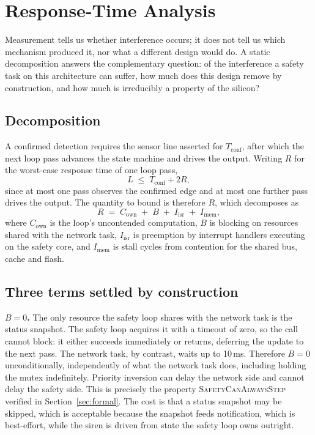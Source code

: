 \section{Response-Time Analysis}\label{sec:timing}

Measurement tells us whether interference occurs; it does not tell us which mechanism produced
it, nor what a different design would do. A static decomposition answers the complementary
question: of the interference a safety task on this architecture can suffer, how much does this
design remove by construction, and how much is irreducibly a property of the silicon?

\subsection{Decomposition}

A confirmed detection requires the sensor line asserted for $T_{\mathrm{conf}}$, after which the
next loop pass advances the state machine and drives the output. Writing $R$ for the worst-case
response time of one loop pass,
\begin{equation}
L \;\le\; T_{\mathrm{conf}} + 2R,
\label{eq:Lbound}
\end{equation}
since at most one pass observes the confirmed edge and at most one further pass drives the
output. The quantity to bound is therefore $R$, which decomposes as
\begin{equation}
R \;=\; C_{\mathrm{own}} \;+\; B \;+\; I_{\mathrm{isr}} \;+\; I_{\mathrm{mem}},
\label{eq:decomp}
\end{equation}
where $C_{\mathrm{own}}$ is the loop's uncontended computation, $B$ is blocking on resources
shared with the network task, $I_{\mathrm{isr}}$ is preemption by interrupt handlers executing on
the safety core, and $I_{\mathrm{mem}}$ is stall cycles from contention for the shared bus,
cache and flash.

\subsection{Three terms settled by construction}

\textbf{$B = 0$.} The only resource the safety loop shares with the network task is the status
snapshot. The safety loop acquires it with a timeout of zero, so the call cannot block: it either
succeeds immediately or returns, deferring the update to the next pass. The network task, by
contrast, waits up to 10\,ms. Therefore $B = 0$ unconditionally, independently of what the
network task does, including holding the mutex indefinitely. Priority inversion can delay the
network side and cannot delay the safety side. This is precisely the property
\textsc{SafetyCanAlwaysStep} verified in Section~\ref{sec:formal}. The cost is that a status
snapshot may be skipped, which is acceptable because the snapshot feeds notification, which is
best-effort, while the siren is driven from state the safety loop owns outright.

